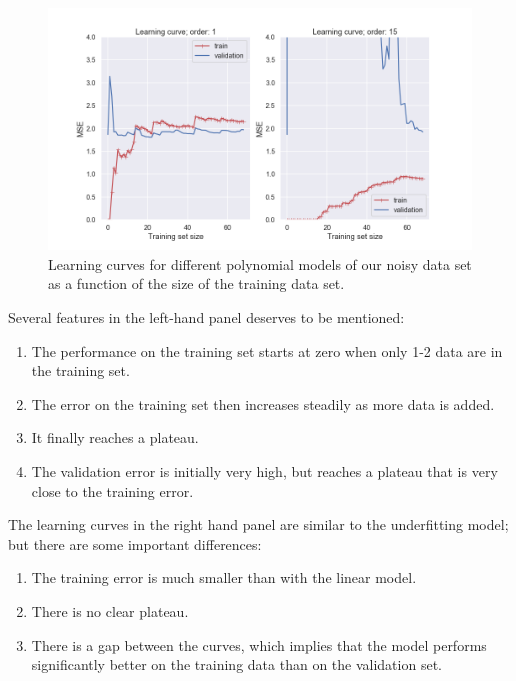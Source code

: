 \documentclass[%
oneside,                 %
final,                   %
10pt]{article}
\begin{document}
\begin{figure}[!ht]  %
  \centerline{\includegraphics[width=0.8\linewidth]{fig/learning_curve.png}}
  \caption{
  Learning curves for different polynomial models of our noisy data set as a function of the size of the training data set. \label{fig-learning_curve}
  }
\end{figure}


Several features in the left-hand panel deserves to be mentioned:

\begin{enumerate}
\item The performance on the training set starts at zero when only 1-2 data are in the training set.

\item The error on the training set then increases steadily as more data is added. 

\item It finally reaches a plateau.

\item The validation error is initially very high, but reaches a plateau that is very close to the training error.
\end{enumerate}

\noindent
The learning curves in the right hand panel are similar to the underfitting model; but there are some important differences:

\begin{enumerate}
\item The training error is much smaller than with the linear model.

\item There is no clear plateau.

\item There is a gap between the curves, which implies that the model performs significantly better on the training data than on the validation set.
\end{enumerate}
\end{document}
